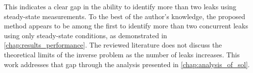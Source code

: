 This indicates a clear gap in the ability to identify more than two leaks using steady-state measurements. To the best of the author’s knowledge, the proposed method appears to be among the first to identify more than two concurrent leaks using only steady-state conditions, as demonstrated in \autoref{chap:results_performance}. The reviewed literature does not discuss the theoretical limits of the inverse problem as the number of leaks increases. This work addresses that gap through the analysis presented in \autoref{chap:analysis_of_sol}.
